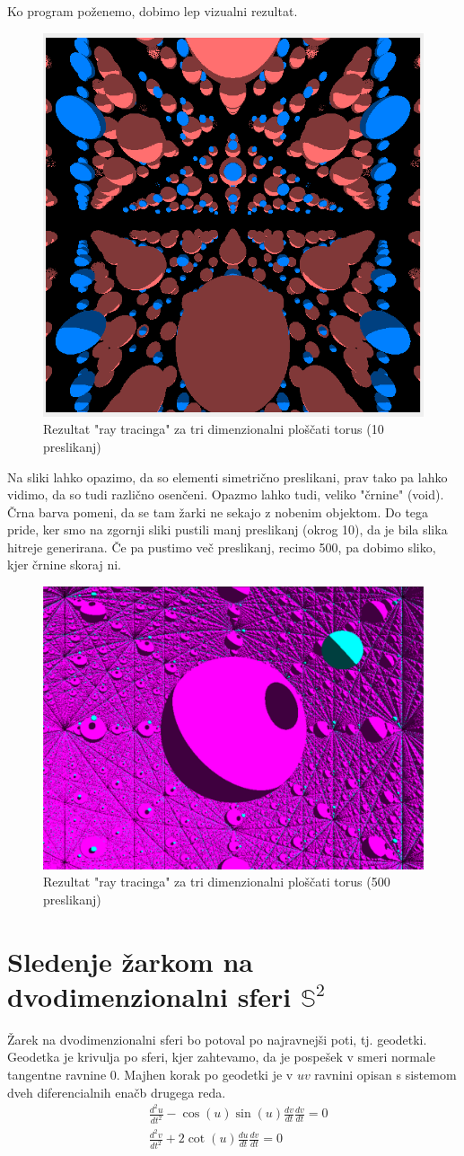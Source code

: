 \documentclass[titlepage]{article}
\begin{document}
Ko program poženemo, dobimo lep vizualni rezultat.
\begin{figure}[H]
    \centering
    \includegraphics[width=0.5\linewidth]{Images/flat_torus.png}
    \caption{Rezultat "ray tracinga" za tri dimenzionalni ploščati torus (10 preslikanj)}
    \label{Slika:Rezultat "ray tracinga" za tri dimenzionalni ploščati torus}
\end{figure}
Na sliki lahko opazimo, da so elementi simetrično preslikani, prav tako pa lahko vidimo, da so tudi različno osenčeni. Opazmo lahko tudi, veliko "črnine" (void). Črna barva pomeni, da se tam žarki ne sekajo z nobenim objektom. Do tega pride, ker smo na zgornji sliki pustili manj preslikanj (okrog 10), da je bila slika hitreje generirana. Če pa pustimo več preslikanj, recimo 500, pa dobimo sliko, kjer črnine skoraj ni.

\begin{figure}[H]
    \centering
    \includegraphics[width=0.5\linewidth]{Images/flat_torus_more.png}
    \caption{Rezultat "ray tracinga" za tri dimenzionalni ploščati torus (500 preslikanj)}
    \label{Slika:Rezultat "ray tracinga" za tri dimenzionalni ploščati torus}
\end{figure}

\section{Sledenje žarkom na dvodimenzionalni sferi \(\mathbb{S}^{2}\)}
Žarek na dvodimenzionalni sferi bo potoval po najravnejši poti, tj. geodetki. Geodetka je krivulja po sferi, kjer zahtevamo, da je
pospešek v smeri normale tangentne ravnine 0. Majhen korak po geodetki je v \( uv \) ravnini opisan s sistemom dveh diferencialnih enačb drugega reda.
\begin{equation}
    \begin{split}
        &\frac{d^{2}u}{dt^{2}}-\cos(u)\sin(u)\frac{dv}{dt}\frac{dv}{dt}=0 \\
        &\frac{d^{2}v}{dt^{2}}+2\cot(u)\frac{du}{dt}\frac{dv}{dt}=0
    \end{split}
\end{equation}
\end{document}
